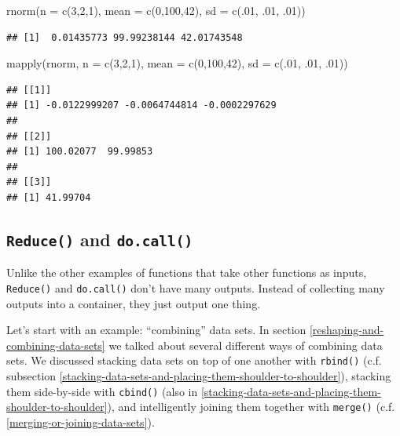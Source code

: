 \documentclass[
  12pt,
  krantz2]{krantz}
\makeatletter
\newenvironment{Shaded}{\begin{snugshade}}{\end{snugshade}}
\newcommand{\AttributeTok}[1]{\textcolor[rgb]{0.61,0.61,0.61}{#1}}
\newcommand{\DecValTok}[1]{\textcolor[rgb]{0.06,0.06,0.06}{#1}}
\newcommand{\FunctionTok}[1]{\textcolor[rgb]{0,0,0}{#1}}
\newcommand{\NormalTok}[1]{#1}
\newenvironment{kframe}{%
\medskip{}
\setlength{\fboxsep}{.8em}
 \def\at@end@of@kframe{}%
 \ifinner\ifhmode%
  \def\at@end@of@kframe{\end{minipage}}%
  \begin{minipage}{\columnwidth}%
 \fi\fi%
 \def\FrameCommand##1{\hskip\@totalleftmargin \hskip-\fboxsep
 \colorbox{shadecolor}{##1}\hskip-\fboxsep
     \hskip-\linewidth \hskip-\@totalleftmargin \hskip\columnwidth}%
 \MakeFramed {\advance\hsize-\width
   \@totalleftmargin\z@ \linewidth\hsize
   \@setminipage}}%
 {\par\unskip\endMakeFramed%
 \at@end@of@kframe}
\renewenvironment{Shaded}{\begin{kframe}}{\end{kframe}}
\makeatother
\begin{document}
\begin{Shaded}
\begin{Highlighting}[]
\FunctionTok{rnorm}\NormalTok{(}\AttributeTok{n =} \FunctionTok{c}\NormalTok{(}\DecValTok{3}\NormalTok{,}\DecValTok{2}\NormalTok{,}\DecValTok{1}\NormalTok{), }\AttributeTok{mean =} \FunctionTok{c}\NormalTok{(}\DecValTok{0}\NormalTok{,}\DecValTok{100}\NormalTok{,}\DecValTok{42}\NormalTok{), }\AttributeTok{sd =} \FunctionTok{c}\NormalTok{(.}\DecValTok{01}\NormalTok{, .}\DecValTok{01}\NormalTok{, .}\DecValTok{01}\NormalTok{))}
\end{Highlighting}
\end{Shaded}

\begin{verbatim}
## [1]  0.01435773 99.99238144 42.01743548
\end{verbatim}

\begin{Shaded}
\begin{Highlighting}[]
\FunctionTok{mapply}\NormalTok{(rnorm, }\AttributeTok{n =} \FunctionTok{c}\NormalTok{(}\DecValTok{3}\NormalTok{,}\DecValTok{2}\NormalTok{,}\DecValTok{1}\NormalTok{), }\AttributeTok{mean =} \FunctionTok{c}\NormalTok{(}\DecValTok{0}\NormalTok{,}\DecValTok{100}\NormalTok{,}\DecValTok{42}\NormalTok{), }\AttributeTok{sd =} \FunctionTok{c}\NormalTok{(.}\DecValTok{01}\NormalTok{, .}\DecValTok{01}\NormalTok{, .}\DecValTok{01}\NormalTok{))}
\end{Highlighting}
\end{Shaded}

\begin{verbatim}
## [[1]]
## [1] -0.0122999207 -0.0064744814 -0.0002297629
## 
## [[2]]
## [1] 100.02077  99.99853
## 
## [[3]]
## [1] 41.99704
\end{verbatim}

\hypertarget{reduce-and-do.call}{%
\subsection{\texorpdfstring{\texttt{Reduce()} and \texttt{do.call()}}{Reduce() and do.call()}}\label{reduce-and-do.call}}

Unlike the other examples of functions that take other functions as inputs, \texttt{Reduce()} and \texttt{do.call()} don't have many outputs. Instead of collecting many outputs into a container, they just output one thing.

Let's start with an example: ``combining'' data sets. In section \ref{reshaping-and-combining-data-sets} we talked about several different ways of combining data sets. We discussed stacking data sets on top of one another with \texttt{rbind()} (c.f. subsection \ref{stacking-data-sets-and-placing-them-shoulder-to-shoulder}), stacking them side-by-side with \texttt{cbind()} (also in \ref{stacking-data-sets-and-placing-them-shoulder-to-shoulder}), and intelligently joining them together with \texttt{merge()} (c.f. \ref{merging-or-joining-data-sets}).
\end{document}
